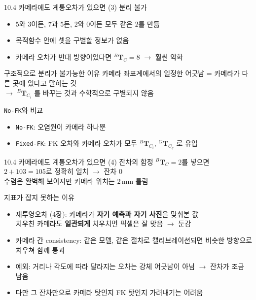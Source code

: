 \documentclass[aspectratio=169,11pt]{beamer}
\newcommand{\T}[3][]{{}^{#2}\mathbf{T}^{#1}_{#3}}   %
\begin{document}
\begin{frame}{10.4 카메라에도 계통오차가 있으면 (3) 분리 불가}
  \begin{itemize}
    \item $5$와 $3$이든, $7$과 $5$든, $2$와 $0$이든 모두 같은 $2$를 만듦
    \item 목적함수 안에 셋을 구별할 정보가 없음
    \item 카메라 오차가 반대 방향이었다면 $\T{B}{C}=8$ $\rightarrow$ 훨씬 악화
  \end{itemize}
  \vfill
  \begin{block}{구조적으로 분리가 불가능한 이유}
    카메라 좌표계에서의 일정한 어긋남 = 카메라가 다른 곳에 있다고 말하는 것\\
    $\rightarrow$ $\T{B}{C_i}$ 를 바꾸는 것과 수학적으로 구별되지 않음
  \end{block}
  \vfill
  \begin{block}{\texttt{No-FK}와 비교}
    \begin{itemize}
      \item \texttt{No-FK}: 오염원이 카메라 하나뿐
      \item \texttt{Fixed-FK}: FK 오차와 카메라 오차가 모두
        $\T{B}{C_i}$, $\T{G}{C_g}$ 로 유입
    \end{itemize}
  \end{block}
\end{frame}

\begin{frame}{10.4 카메라에도 계통오차가 있으면 (4) 잔차의 함정}
  $\T{B}{C}=2$를 넣으면 $2+103=105$로 정확히 일치
  $\rightarrow$ \alert{잔차 $0$}\\
  수렴은 완벽해 보이지만 카메라 위치는 $2\,\mathrm{mm}$ 틀림
  \vfill
  \begin{block}{지표가 잡지 못하는 이유}
    \begin{itemize}
      \item 재투영오차 (4장): 카메라가 \textbf{자기 예측과 자기 사진}을 맞춰본 값\\
        치우친 카메라도 \textbf{일관되게} 치우치면 픽셀은 잘 맞음 $\rightarrow$ 둔감
      \item 카메라 간 consistency: 같은 모델, 같은 절차로 캘리브레이션되면
        비슷한 방향으로 치우쳐 함께 통과
    \end{itemize}
  \end{block}
  \vfill
  \begin{itemize}
    \item 예외: 거리나 각도에 따라 달라지는 오차는 강체 어긋남이 아님
      $\rightarrow$ 잔차가 조금 남음
    \item 다만 그 잔차만으로 카메라 탓인지 FK 탓인지 가려내기는 어려움
  \end{itemize}
\end{frame}
\end{document}
